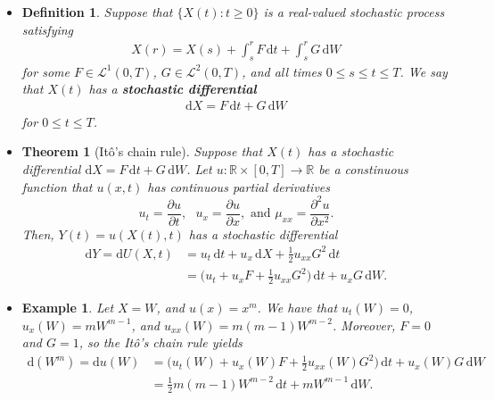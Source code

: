 \documentclass[10pt]{article}
\newtheorem{theorem}[lemma]{Theorem}
\newtheorem{definition}[lemma]{Definition}
\newtheorem{example}[lemma]{Example}
\newcommand{\dee}{\mathrm{d}}
\newcommand{\mcal}[1]{\mathcal{#1}}
\newcommand{\Real}{\mathbb{R}}
\begin{document}
\begin{itemize}
  \item \begin{definition}
    Suppose that $\{ X(t) : t \geq 0 \}$ is a real-valued stochastic process satisfying
    \begin{align*}
      X(r) = X(s) + \int_s^r F\, \dee t + \int_s^r G\, \dee W
    \end{align*}
    for some $F \in \mcal{L}^1(0,T)$, $G \in \mcal{L}^2(0,T)$, and all times $0 \leq s \leq t \leq T$. We say that $X(t)$ has a {\bf stochastic differential}
    \begin{align*}
      \dee X = F\, \dee t + G\, \dee W
    \end{align*}
    for $0 \leq t \leq T$.
  \end{definition}

  \item \begin{theorem}[It\^{o}'s chain rule]
    Suppose that $X(t)$ has a stochastic differential $\dee X = F\, \dee t + G\, \dee W$. Let $u: \Real \times [0,T] \rightarrow \Real$ be a constinuous function that $u(x,t)$ has continuous partial derivatives $$u_t = \frac{\partial u}{\partial t},\mbox{ }u_x = \frac{\partial u}{\partial x},\mbox{ and }\mu_{xx} = \frac{\partial^2 u}{\partial x^2}.$$ Then, $Y(t) = u(X(t),t)$ has a stochastic differential 
    \begin{align*}
      \dee Y = \dee U(X,t) 
      &= u_t\,\dee t + u_x\, \dee X + \frac{1}{2} u_{xx} G^2\, \dee t \\
      &= \bigg(u_t + u_x F + \frac{1}{2}u_{xx} G^2\bigg)\, \dee t + u_x G\, \dee W.
    \end{align*}
  \end{theorem}

  \item \begin{example}
    Let $X = W$, and $u(x) = x^m$. We have that $u_t(W) = 0$, $u_x(W) = mW^{m-1}$, and $u_{xx}(W) = m(m-1)W^{m-2}$. Moreover, $F = 0$ and $G = 1$, so the It\^{o}'s chain rule yields
    \begin{align*}
      \dee(W^m) 
      = \dee u(W)
      &= \bigg(u_t(W) + u_x(W) F + \frac{1}{2}u_{xx}(W) G^2\bigg)\, \dee t + u_x(W) G\, \dee W \\
      &= \frac{1}{2} m(m-1) W^{m-2}\, \dee t + mW^{m-1}\, \dee W.
    \end{align*}
  \end{example}
  
  
\end{itemize}


  
\end{document}
